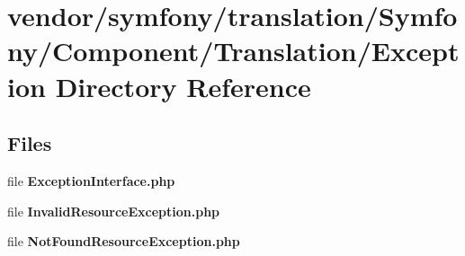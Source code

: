 \section{vendor/symfony/translation/\+Symfony/\+Component/\+Translation/\+Exception Directory Reference}
\label{dir_f886259a6b7dadc8fd79d755dd049af1}
\subsection*{Files}
\begin{DoxyCompactItemize}
\item 
file {\bf Exception\+Interface.\+php}
\item 
file {\bf Invalid\+Resource\+Exception.\+php}
\item 
file {\bf Not\+Found\+Resource\+Exception.\+php}
\end{DoxyCompactItemize}
